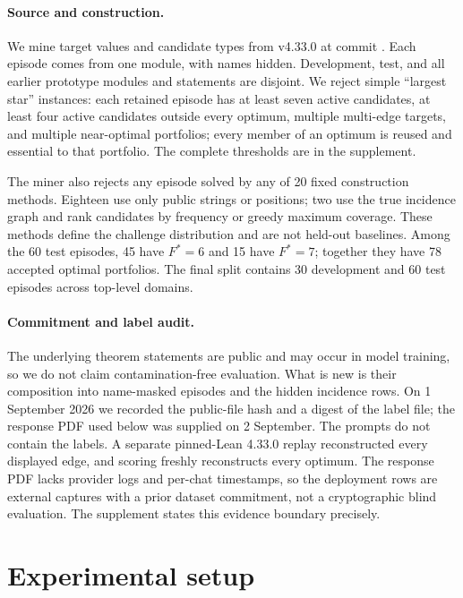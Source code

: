\paragraph{Source and construction.}
We mine target values and candidate types from \mathlib{} v4.33.0 at commit
\citep{mathlib2020,mathlib433commit}.  Each episode comes from one module, with
names hidden.  Development, test, and all earlier prototype modules and
statements are disjoint.  We reject simple ``largest star'' instances: each
retained episode has at least seven active candidates, at least four active
candidates outside every optimum, multiple multi-edge targets, and multiple
near-optimal portfolios; every member of an optimum is reused and essential to
that portfolio.  The complete thresholds are in the supplement.

The miner also rejects any episode solved by any of 20 fixed construction
methods.  Eighteen use only public strings or positions; two use the true
incidence graph and rank candidates by frequency or greedy maximum coverage.
These methods define the challenge distribution and are not held-out baselines.
Among the 60 test episodes, 45 have $F^*=6$ and 15 have $F^*=7$; together they
have 78 accepted optimal portfolios.  The final split contains 30 development
and 60 test episodes across \BlindDomainCount{} top-level domains.

\paragraph{Commitment and label audit.}
The underlying theorem statements are public and may occur in model training,
so we do not claim contamination-free evaluation.  What is new is their
composition into name-masked episodes and the hidden incidence rows.  On 1
September 2026 we recorded the public-file hash and a digest of the label file;
the response PDF used below was supplied on 2 September.  The prompts do not
contain the labels.  A separate pinned-Lean 4.33.0 replay reconstructed every
displayed edge, and scoring freshly reconstructs every optimum.  The response
PDF lacks provider logs and per-chat timestamps, so the deployment rows are
external captures with a prior dataset commitment, not a cryptographic blind
evaluation.  The supplement states this evidence boundary precisely.

\section{Experimental setup}

